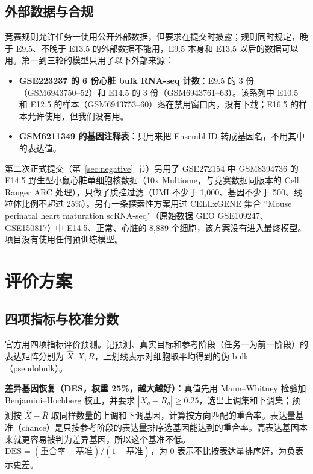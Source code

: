\documentclass[UTF8,zihao=-4,fontset=none,a4paper]{ctexart}
\begin{document}
\subsection{外部数据与合规}

竞赛规则允许任务一使用公开外部数据，但要求在提交时披露；规则同时规定，晚于 E9.5、不晚于 E13.5 的外部数据不能用，E9.5 本身和 E13.5 以后的数据可以用\cite{rules}。第一到三轮的模型只用了以下外部来源：
\begin{itemize}
  \item \textbf{GSE223237 的 6 份心脏 bulk RNA-seq 计数}\cite{gse223237}：E9.5 的 3 份（GSM6943750--52）和 E14.5 的 3 份（GSM6943761--63）。该系列中 E10.5 和 E12.5 的样本（GSM6943753--60）落在禁用窗口内，没有下载；E16.5 的样本允许使用，但我们没有用。
  \item \textbf{GSM6211349 的基因注释表}\cite{gsm6211349}：只用来把 Ensembl ID 转成基因名，不用其中的表达值。
\end{itemize}
第二次正式提交（第~\ref{sec:negative}~节）另用了 GSE272154 中 GSM8394736 的 E14.5 野生型小鼠心脏单细胞核数据\cite{gsm8394736}（10x Multiome，与竞赛数据同版本的 Cell Ranger ARC 处理），只做了质控过滤（UMI 不少于 1,000、基因不少于 500、线粒体比例不超过 25\%）。另有一条探索性方案用过 CELLxGENE 集合 “Mouse perinatal heart maturation scRNA-seq”（原始数据 GEO GSE109247、GSE150817）中 E14.5、正常、心脏的 8,889 个细胞\cite{perinatal}，该方案没有进入最终模型。项目没有使用任何预训练模型。

\section{评价方案}

\subsection{四项指标与校准分数}

官方用四项指标评价预测\cite{evaluation}。记预测、真实目标和参考阶段（任务一为前一阶段）的表达矩阵分别为 $\hat X, X, R$，上划线表示对细胞取平均得到的伪 bulk（pseudobulk）。

\textbf{差异基因恢复（DES，权重 25\%，越大越好）}：真值先用 Mann--Whitney 检验加 Benjamini--Hochberg 校正\cite{bh}，并要求 $|\bar X_g-\bar R_g|\ge 0.25$，选出上调集和下调集；预测按 $\bar{\hat X}-\bar R$ 取同样数量的上调和下调基因，计算按方向匹配的重合率。表达量基准（chance）是只按参考阶段的表达量排序选基因能达到的重合率。高表达基因本来就更容易被判为差异基因，所以这个基准不低。$\mathrm{DES}=(\text{重合率}-\text{基准})/(1-\text{基准})$，为 0 表示不比按表达量排序好，为负表示更差。
\end{document}
